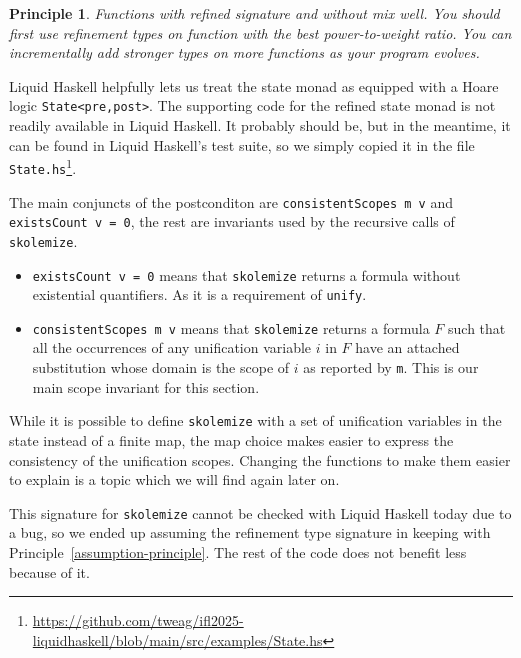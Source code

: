 \documentclass[sigconf, review]{acmart}
\newcommand{\tc}[1]{{\small\texttt{#1}}}
\newcommand{\sourcefile}[1]{\tc{#1}\footnote{\scriptsize\url{https://github.com/tweag/ifl2025-liquidhaskell/blob/main/src/examples/#1}}}
\newtheorem{principle}{Principle}
\begin{document}
\begin{principle}
  Functions with refined signature and without mix well. You should first use
  refinement types on function with the best power-to-weight ratio. You can
  incrementally add stronger types on more functions as your program evolves.
\end{principle}

Liquid Haskell helpfully lets us treat the state monad as equipped with
a Hoare logic \tc{State<pre,post>}. The supporting code for the refined state
monad is not readily available in Liquid Haskell. It probably should be, but in
the meantime, it can be found in Liquid Haskell's test suite, so we simply
copied it in the file \sourcefile{State.hs}.

The main conjuncts of the postconditon are \tc{consistent\-Scopes m v} and
\tc{existsCount v = 0}, the rest are invariants used by the recursive calls of
\tc{skolemize}.
\begin{itemize}
  \item \tc{existsCount v = 0} means that \tc{skolemize} returns a formula without
  existential quantifiers. As it is a requirement of \tc{unify}.
  \item \tc{consistentScopes m v} means that \tc{skolemize} returns a
  formula $F$ such that all the occurrences of any unification variable $i$ in $F$
  have an attached substitution whose domain is the scope of $i$ as reported by \tc{m}. This is our main scope invariant for this
  section.
\end{itemize}

While it is possible to define \tc{skolemize} with a set of unification variables
in the state instead of a finite map, the map choice makes easier to express the
consistency of the unification scopes. Changing the functions to make them easier
to explain is a topic which we will find again later on.

This signature for \tc{skolemize} cannot be checked with Liquid Haskell today
due to
a bug, so we ended up assuming the refinement type signature
in keeping with Principle~\ref{assumption-principle}. The rest
of the code does not benefit less because of it.

\end{document}
